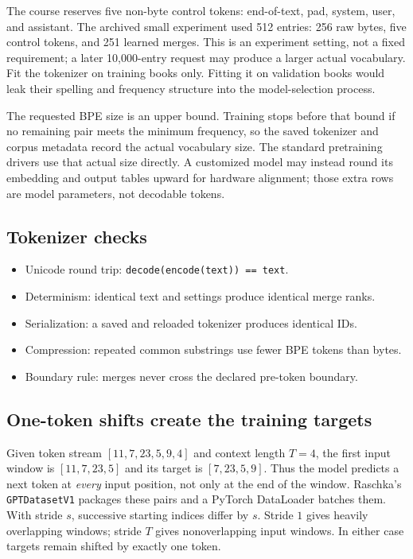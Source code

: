 \documentclass[11pt]{article}
\begin{document}
The course reserves five non-byte control tokens: end-of-text, pad, system,
user, and assistant. The archived small experiment used 512 entries: 256 raw
bytes, five control tokens, and 251 learned merges. This is an experiment
setting, not a fixed requirement; a later 10,000-entry request may produce a
larger actual vocabulary. Fit the tokenizer on training books only.
Fitting it on validation books would leak their spelling and frequency
structure into the model-selection process.

The requested BPE size is an upper bound. Training stops before that bound if no
remaining pair meets the minimum frequency, so the saved tokenizer and corpus
metadata record the actual vocabulary size. The standard pretraining drivers use
that actual size directly. A customized model may instead round its embedding
and output tables upward for hardware alignment; those extra rows are model
parameters, not decodable tokens.

\subsection*{Tokenizer checks}
\begin{itemize}
\item Unicode round trip: \texttt{decode(encode(text)) == text}.
\item Determinism: identical text and settings produce identical merge ranks.
\item Serialization: a saved and reloaded tokenizer produces identical IDs.
\item Compression: repeated common substrings use fewer BPE tokens than bytes.
\item Boundary rule: merges never cross the declared pre-token boundary.
\end{itemize}

\subsection{One-token shifts create the training targets}
Given token stream $[11,7,23,5,9,4]$ and context length $T=4$, the first input
window is $[11,7,23,5]$ and its target is $[7,23,5,9]$. Thus the model predicts a
next token at \emph{every} input position, not only at the end of the window.
Raschka's \texttt{GPTDatasetV1} packages these pairs and a PyTorch DataLoader
batches them. With stride $s$, successive starting indices differ by $s$.
Stride $1$ gives heavily overlapping windows; stride $T$ gives nonoverlapping
input windows. In either case targets remain shifted by exactly one token.
\end{document}
